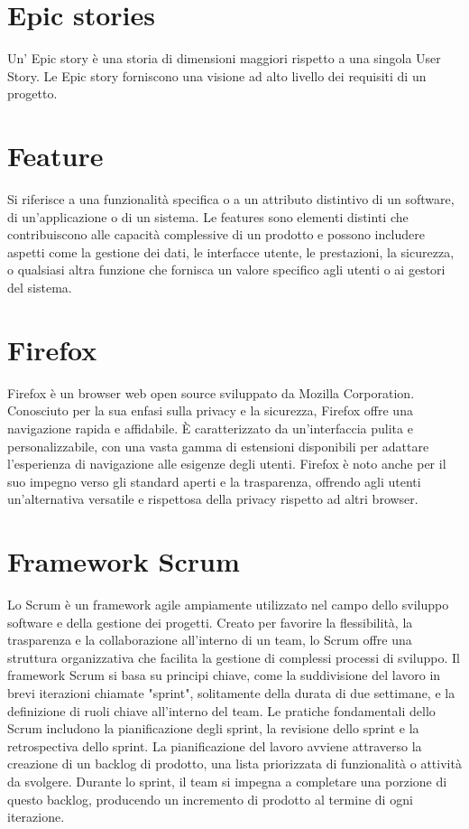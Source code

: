 \documentclass{article}
\begin{document}
\section{Epic stories}
Un' Epic story è una storia di dimensioni maggiori rispetto a una singola User Story.
Le Epic story forniscono una visione ad alto livello dei requisiti di un progetto.

\section{Feature}
Si riferisce a una funzionalità specifica o a un attributo distintivo di un software, di un'applicazione o di un sistema. Le features sono elementi distinti che contribuiscono alle capacità complessive di un prodotto e possono includere aspetti come la gestione dei dati, le interfacce utente, le prestazioni, la sicurezza, o qualsiasi altra funzione che fornisca un valore specifico agli utenti o ai gestori del sistema. 

\section{Firefox}
Firefox è un browser web open source sviluppato da Mozilla Corporation. Conosciuto per la sua enfasi sulla privacy e la sicurezza, Firefox offre una navigazione rapida e affidabile. È caratterizzato da un'interfaccia pulita e personalizzabile, con una vasta gamma di estensioni disponibili per adattare l'esperienza di navigazione alle esigenze degli utenti. Firefox è noto anche per il suo impegno verso gli standard aperti e la trasparenza, offrendo agli utenti un'alternativa versatile e rispettosa della privacy rispetto ad altri browser.

\section{Framework Scrum}
Lo Scrum è un framework agile ampiamente utilizzato nel campo dello sviluppo software e della gestione dei progetti. Creato per favorire la flessibilità, la trasparenza e la collaborazione all'interno di un team, lo Scrum offre una struttura organizzativa che facilita la gestione di complessi processi di sviluppo. Il framework Scrum si basa su principi chiave, come la suddivisione del lavoro in brevi iterazioni chiamate "sprint", solitamente della durata di due settimane, e la definizione di ruoli chiave all'interno del team. Le pratiche fondamentali dello Scrum includono la pianificazione degli sprint, la revisione dello sprint e la retrospectiva dello sprint. La pianificazione del lavoro avviene attraverso la creazione di un backlog di prodotto, una lista priorizzata di funzionalità o attività da svolgere. Durante lo sprint, il team si impegna a completare una porzione di questo backlog, producendo un incremento di prodotto al termine di ogni iterazione.
\end{document}
